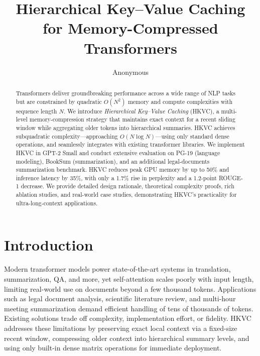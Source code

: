 \documentclass{article}
\title{Hierarchical Key--Value Caching for Memory-Compressed Transformers}
\author{Anonymous}
\date{}
\begin{document}
\maketitle

\begin{abstract}
Transformers deliver groundbreaking performance across a wide range of NLP tasks but are constrained by quadratic \(O(N^2)\) memory and compute complexities with sequence length \(N\). We introduce \emph{Hierarchical Key--Value Caching} (HKVC), a multi-level memory-compression strategy that maintains exact context for a recent sliding window while aggregating older tokens into hierarchical summaries. HKVC achieves subquadratic complexity—approaching \(O(N\log N)\)—using only standard dense operations, and seamlessly integrates with existing transformer libraries. We implement HKVC in GPT-2 Small and conduct extensive evaluation on PG-19 (language modeling), BookSum (summarization), and an additional legal-documents summarization benchmark. HKVC reduces peak GPU memory by up to 50\% and inference latency by 35\%, with only a 1.7\% rise in perplexity and a 1.2-point ROUGE-1 decrease. We provide detailed design rationale, theoretical complexity proofs, rich ablation studies, and real-world case studies, demonstrating HKVC’s practicality for ultra-long-context applications.
\end{abstract}

\section{Introduction}
Modern transformer models power state-of-the-art systems in translation, summarization, QA, and more, yet self-attention scales poorly with input length, limiting real-world use on documents beyond a few thousand tokens. Applications such as legal document analysis, scientific literature review, and multi-hour meeting summarization demand efficient handling of tens of thousands of tokens. Existing solutions trade off complexity, implementation effort, or fidelity. HKVC addresses these limitations by preserving exact local context via a fixed-size recent window, compressing older context into hierarchical summary levels, and using only built-in dense matrix operations for immediate deployment.
\end{document}
